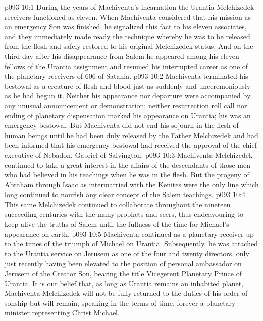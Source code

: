 \vs p093 10:1 During the years of Machiventa’s incarnation the Urantia Melchizedek receivers functioned as eleven. When Machiventa considered that his mission as an emergency Son was finished, he signalized this fact to his eleven associates, and they immediately made ready the technique whereby he was to be released from the flesh and safely restored to his original Melchizedek status. And on the third day after his disappearance from Salem he appeared among his eleven fellows of the Urantia assignment and resumed his interrupted career as one of the planetary receivers of 606 of Satania.
\vs p093 10:2 Machiventa terminated his bestowal as a creature of flesh and blood just as suddenly and unceremoniously as he had begun it. Neither his appearance nor departure were accompanied by any unusual announcement or demonstration; neither resurrection roll call nor ending of planetary dispensation marked his appearance on Urantia; his was an emergency bestowal. But Machiventa did not end his sojourn in the flesh of human beings until he had been duly released by the Father Melchizedek and had been informed that his emergency bestowal had received the approval of the chief executive of Nebadon, Gabriel of Salvington.
\vs p093 10:3 \pc Machiventa Melchizedek continued to take a great interest in the affairs of the descendants of those men who had believed in his teachings when he was in the flesh. But the progeny of Abraham through Isaac as intermarried with the Kenites were the only line which long continued to nourish any clear concept of the Salem teachings.
\vs p093 10:4 This same Melchizedek continued to collaborate throughout the nineteen succeeding centuries with the many prophets and seers, thus endeavouring to keep alive the truths of Salem until the fullness of the time for Michael’s appearance on earth.
\vs p093 10:5 Machiventa continued as a planetary receiver up to the times of the triumph of Michael on Urantia. Subsequently, he was attached to the Urantia service on Jerusem as one of the four and twenty directors, only just recently having been elevated to the position of personal ambassador on Jerusem of the Creator Son, bearing the title Vicegerent Planetary Prince of Urantia. It is our belief that, as long as Urantia remains an inhabited planet, Machiventa Melchizedek will not be fully returned to the duties of his order of sonship but will remain, speaking in the terms of time, forever a planetary minister representing Christ Michael.
